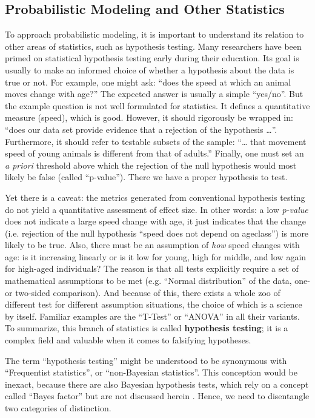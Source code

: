 \subsection{Probabilistic Modeling and Other Statistics}
\label{sec:org0cc6a35}
To approach probabilistic modeling, it is important to understand its relation to other areas of statistics, such as hypothesis testing.
Many researchers have been primed on statistical hypothesis testing early during their education.
Its goal is usually to make an informed choice of whether a hypothesis about the data is true or not.
For example, one might ask: ``does the speed at which an animal moves change with age?''
The expected answer is usually a simple ``yes/no''.
But the example question is not well formulated for statistics.
It defines a quantitative measure (speed), which is good.
However, it should rigorously be wrapped in: ``does our data set provide evidence that a rejection of the hypothesis \ldots{}''.
Furthermore, it should refer to testable subsets of the sample: ``\ldots{} that movement speed of young animals is different from that of adults.''
Finally, one must set an \emph{a priori} threshold above which the rejection of the null hypothesis would most likely be false (called ``p-value'').
There we have a proper hypothesis to test.

Yet there is a caveat: the metrics generated from conventional hypothesis testing do not yield a quantitative assessment of effect size.
In other words: a low \emph{p-value} does not indicate a large speed change with age, it just indicates that the change (i.e. rejection of the null hypothesis ``speed does not depend on ageclass'') is more likely to be true.
Also, there must be an assumption of \emph{how} speed changes with age: is it increasing linearly or is it low for young, high for middle, and low again for high-aged individuals?
The reason is that all tests explicitly require a set of mathematical assumptions to be met (e.g. ``Normal distribution'' of the data, one- or two-sided comparison).
And because of this, there exists a whole zoo of different test for different assumption situations, the choice of which is a science by itself.
Familiar examples are the ``T-Test'' or ``ANOVA'' in all their variants.
To summarize, this branch of statistics is called \textbf{hypothesis testing}; it is a complex field and valuable when it comes to falsifying hypotheses.

The term ``hypothesis testing'' might be understood to be synonymous with ``Frequentist statistics'', or ``non-Bayesian statistics''.
This conception would be inexact, because there are also Bayesian hypothesis tests, which rely on a concept called ``Bayes factor'' but are not discussed herein \citep[cf.][]{Shikano2019}.
Hence, we need to disentangle two categories of distinction.

